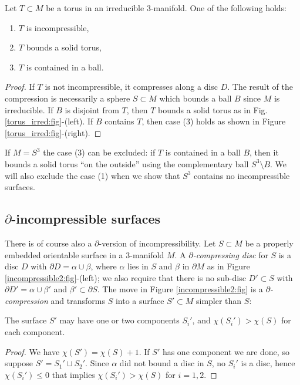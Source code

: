 \begin{prop} \label{T:M:prop}
Let $T\subset M$ be a torus in an irreducible 3-manifold. One of the following holds:
\begin{enumerate}
\item $T$ is incompressible,
\item $T$ bounds a solid torus,
\item $T$ is contained in a ball.
\end{enumerate}
\end{prop}
\begin{proof}
If $T$ is not incompressible, it compresses along a disc $D$. The result of the compression is necessarily a sphere $S\subset M$ which bounds a ball $B$ since $M$ is irreducible. If $B$ is disjoint from $T$, then $T$ bounds a solid torus as in Fig.\ref{torus_irred:fig}-(left). If $B$ contains $T$, then case (3) holds as shown in Figure \ref{torus_irred:fig}-(right).
\end{proof}

If $M=S^3$ the case (3) can be excluded: if $T$ is contained in a ball $B$, then it bounds a solid torus ``on the outside'' using the complementary ball $S^3\setminus B$. We will also exclude the case (1) when we show that $S^3$ contains no incompressible surfaces.

\subsection{$\partial$-incompressible surfaces}
There is of course also a $\partial$-version of incompressibility. Let $S\subset M$ be a properly embedded orientable surface in a 3-manifold $M$. A \emph{$\partial$-compressing disc} for $S$ is a disc $D$ with $\partial D = \alpha \cup \beta$, where $\alpha$ lies in $S$ and $\beta$ in $\partial M$ as in Figure \ref{incompressible2:fig}-(left); we also require that there is no sub-disc $D'\subset S$ with $\partial D' = \alpha\cup \beta' $ and $\beta'\subset\partial S$. 
The move in Figure \ref{incompressible2:fig} is a \emph{$\partial$-compression} and transforms $S$ into a surface $S'\subset M$ simpler than $S$:

\begin{prop}
The surface $S'$ may have one or two components $S_i'$, and $\chi(S_i')>\chi(S)$ for each component. 
\end{prop}
\begin{proof}
We have $\chi(S') = \chi(S) + 1$. If $S'$ has one component we are done, so suppose $S' = S_1' \sqcup S_2'$. Since $\alpha$ did not bound a disc in $S$, no $S_i'$ is a disc, hence $\chi(S_i')\leqslant 0$ that implies $\chi(S_i')> \chi(S)$ for $i=1,2$.
\end{proof}

